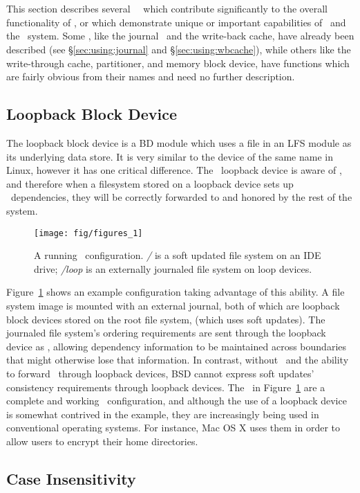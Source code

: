 \section{\Modules}
\label{sec:modules}

This section describes several \Kudos\ \modules\ which contribute significantly
to the overall functionality of \Kudos, or which demonstrate unique or
important capabilities of \chdescs\ and the \module\ system. Some \modules,
like the journal \module\ and the write-back cache, have already been described
(see \S\ref{sec:using:journal} and \S\ref{sec:using:wbcache}), while others
like the write-through cache, partitioner, and memory block device, have
functions which are fairly obvious from their names and need no further
description.





\subsection{Loopback Block Device}
\label{sec:modules:loop}

The loopback block device is a BD module which uses a file in an LFS module as
its underlying data store. It is very similar to the device of the same name in
Linux, however it has one critical difference. The \Kudos\ loopback device is
aware of \chdescs, and therefore when a filesystem stored on a loopback device
sets up \chdesc\ dependencies, they will be correctly forwarded to and honored
by the rest of the system.

\begin{figure}[htb]
  \centering
  \texttt{[image: fig/figures\_1]}
  \caption{A running \Kudos\ configuration. {\it/} is a soft updated
    file system on an IDE drive; {\it/loop} is an externally journaled
    file system on loop devices.}
  \label{fig:kfs-graph}
\end{figure}

Figure~\ref{fig:kfs-graph} shows an example configuration taking advantage of
this ability. A file system image is mounted with an external journal, both of
which are loopback block devices stored on the root file system, (which uses
soft updates). The journaled file system's ordering requirements are sent
through the loopback device as \chdescs, allowing dependency information to be
maintained across boundaries that might otherwise lose that information. In
contrast, without \chdescs\ and the ability to forward \chdescs\ through
loopback devices, BSD cannot express soft updates' consistency requirements
through loopback devices. The \modules\ in Figure~\ref{fig:kfs-graph} are a
complete and working \Kudos\ configuration, and although the use of a loopback
device is somewhat contrived in the example, they are increasingly being used in
conventional operating systems. For instance, Mac OS X uses them in order to
allow users to encrypt their home directories.

\subsection{Case Insensitivity}
\label{sec:modules:icase}

